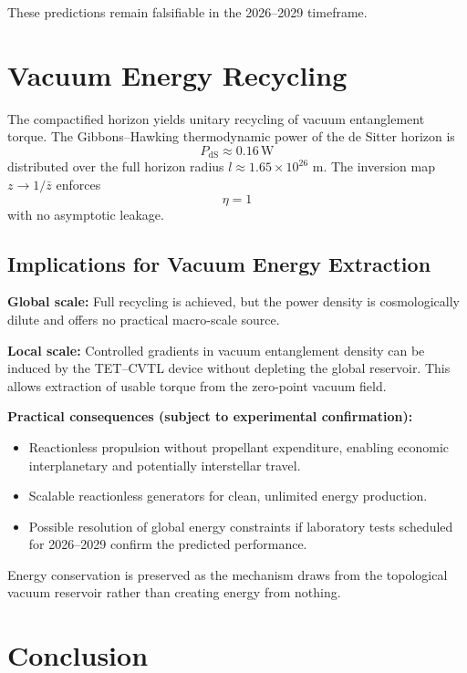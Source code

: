\documentclass[11pt,a4paper]{article}
\begin{document}
These predictions remain falsifiable in the 2026--2029 timeframe.

\section{Vacuum Energy Recycling}

The compactified horizon yields unitary recycling of vacuum entanglement torque. The Gibbons--Hawking thermodynamic power of the de Sitter horizon is
\begin{equation}
P_{\text{dS}} \approx 0.16 \, \text{W}
\end{equation}
distributed over the full horizon radius $l \approx 1.65 \times 10^{26}$ m. The inversion map $z \to 1/\bar{z}$ enforces
\begin{equation}
\eta = 1
\end{equation}
with no asymptotic leakage.

\subsection{Implications for Vacuum Energy Extraction}

\textbf{Global scale:} Full recycling is achieved, but the power density is cosmologically dilute and offers no practical macro-scale source.

\textbf{Local scale:} Controlled gradients in vacuum entanglement density can be induced by the TET--CVTL device without depleting the global reservoir. This allows extraction of usable torque from the zero-point vacuum field.

\textbf{Practical consequences (subject to experimental confirmation):}
\begin{itemize}
\item Reactionless propulsion without propellant expenditure, enabling economic interplanetary and potentially interstellar travel.
\item Scalable reactionless generators for clean, unlimited energy production.
\item Possible resolution of global energy constraints if laboratory tests scheduled for 2026--2029 confirm the predicted performance.
\end{itemize}

Energy conservation is preserved as the mechanism draws from the topological vacuum reservoir rather than creating energy from nothing.

\section{Conclusion}
\end{document}
